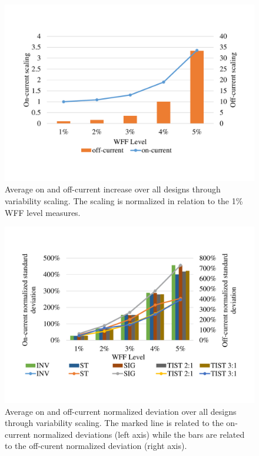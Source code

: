\documentclass[pgmicro,mestrado,english]{iiufrgs}
\begin{document}
    \begin{figure}[]
        \centering
            \includegraphics[width=1\textwidth, trim={1.25cm 3cm 2cm 3cm}, clip]{on-off-scaling2.pdf}
            \caption{Average on and off-current increase over all designs through variability scaling. The scaling is normalized in relation to the 1\% WFF level measures.}
        \label{figOnOffScal}
    \end{figure}

    \begin{figure}[]
        \centering
            \includegraphics[width=1\textwidth, trim={1.25cm 1cm 2cm 3cm}, clip]{compOnOffCurr.pdf}
            \caption{Average on and off-current normalized deviation over all designs through variability scaling. The marked line is related to the on-current normalized deviations (left axis) while the bars are related to the off-curent normalized deviation (right axis).}
        \label{fig:OnOffDev}
    \end{figure}
\end{document}

